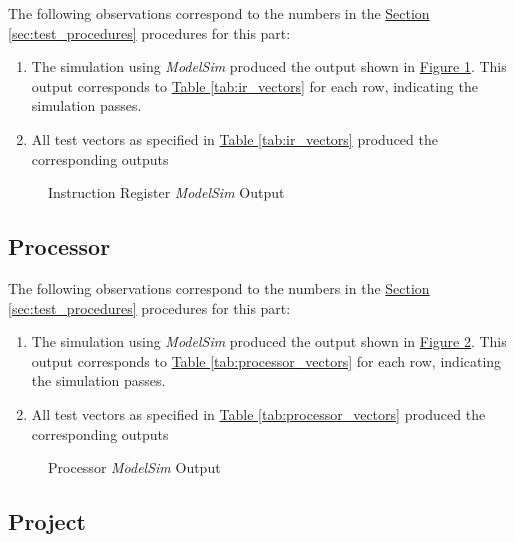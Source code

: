 The following observations correspond to the numbers in the \hyperref[sec:test_procedures]{Section \ref*{sec:test_procedures}} procedures for this part:

\begin{enumerate}
    \item The simulation using \emph{ModelSim} produced the output shown in \hyperref[fig:ir_output]{Figure \ref*{fig:ir_output}}.
    This output corresponds to \hyperref[tab:ir_vectors]{Table \ref*{tab:ir_vectors}} for each row, indicating the simulation passes.
    \item All test vectors as specified in \hyperref[tab:ir_vectors]{Table \ref*{tab:ir_vectors}} produced the corresponding outputs
\end{enumerate}

\begin{figure}
    \caption{Instruction Register \emph{ModelSim} Output\label{fig:ir_output}}
\end{figure}


\subsection{Processor} %
\label{sub:processor}

The following observations correspond to the numbers in the \hyperref[sec:test_procedures]{Section \ref*{sec:test_procedures}} procedures for this part:

\begin{enumerate}
    \item The simulation using \emph{ModelSim} produced the output shown in \hyperref[fig:processor_output]{Figure \ref*{fig:processor_output}}.
    This output corresponds to \hyperref[tab:processor_vectors]{Table \ref*{tab:processor_vectors}} for each row, indicating the simulation passes.
    \item All test vectors as specified in \hyperref[tab:processor_vectors]{Table \ref*{tab:processor_vectors}} produced the corresponding outputs
\end{enumerate}

\begin{figure}
    \caption{Processor \emph{ModelSim} Output\label{fig:processor_output}}
\end{figure}


\subsection{Project} %
\label{sub:projects}

